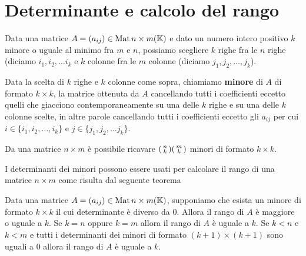 \section{Determinante e calcolo del rango}
Data una matrice $A = (a_{ij}) \in \operatorname{Mat}{n \times m}(\mathbb{K})$ e dato un
numero intero positivo $k$ minore o uguale al minimo fra $m$ e $n$, possiamo
scegliere $k$ righe fra le $n$ righe (diciamo $i_1, i_2, \dots i_k$ e
$k$ colonne fra le $m$ colonne (diciamo $j_1, j_2, \dots, j_k$).

\begin{definition}
	Data la scelta di $k$ righe e $k$ colonne come sopra, chiamiamo
	\textbf{minore} di $A$ di formato $k \times k$, la matrice ottenuta da $A$
	cancellando tutti i coefficienti eccetto quelli che giacciono
	contemporaneamente su una delle $k$ righe e su una delle $k$ colonne scelte,
	in altre parole cancellando tutti i coefficienti eccetto gli $a_{ij}$ per
	cui $i \in \{i_1, i_2, \dots, i_k\}$ e $j \in \{j_1, j_2, \dots j_k\}$.
\end{definition}

\begin{observation}
	Da una matrice $n \times m$ è possibile ricavare $\begin{psmallmatrix}
			n \\ k \end{psmallmatrix} \begin{psmallmatrix}
			m \\ k \end{psmallmatrix}$ minori di formato $k \times k$.
\end{observation}

I determinanti dei minori possono essere usati per calcolare il rango di una
matrice $n \times m$ come risulta dal seguente teorema

\begin{theorem}
	Data una matrice $A = (a_{ij}) \in \operatorname{Mat}{n \times m}(\mathbb{K})$, supponiamo
	che esista un minore di formato $k \times k$ il cui determinante è diverso
	da 0. Allora il rango di $A$ è maggiore o uguale a $k$. Se $k = n$ oppure
	$k = m$ allora il rango di $A$ è uguale a $k$. Se $k < n$ e $k < m$ e tutti
	i determinanti dei minori di formato $(k + 1) \times (k + 1)$ sono uguali a 0
	allora il rango di $A$ è uguale a $k$.
\end{theorem}

